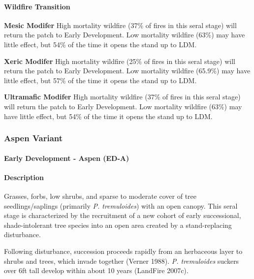 \paragraph{Wildfire Transition}

\begin{adjustwidth}{2cm}{}
\textbf{Mesic Modifer } High mortality wildfire (37\% of fires in this seral stage) will return the patch to Early Development. Low mortality wildfire (63\%) may have little effect, but 54\% of the time it opens the stand up to LDM. 

\textbf{Xeric Modifer} High mortality wildfire (25\% of fires in this seral stage) will return the patch to Early Development. Low mortality wildfire (65.9\%) may have little effect, but 57\% of the time it opens the stand up to LDM. 

\textbf{Ultramafic Modifer} High mortality wildfire (37\% of fires in this seral stage) will return the patch to Early Development. Low mortality wildfire (63\%) may have little effect, but 54\% of the time it opens the stand up to LDM.

\end{adjustwidth}

\noindent\hrulefill
\noindent\hrulefill

\subsubsection{Aspen Variant}

\paragraph{Early Development - Aspen (ED-A)}

\paragraph{Description} Grasses, forbs, low shrubs, and sparse to moderate cover of tree seedlings/saplings (primarily \emph{P. tremuloides}) with an open canopy. This seral stage is characterized by the recruitment of a new cohort of early successional, shade-intolerant tree species into an open area created by a stand-replacing disturbance.

Following disturbance, succession proceeds rapidly from an herbaceous layer to shrubs and trees, which invade together (Verner 1988). \emph{P. tremuloides} suckers over 6ft tall develop within about 10 years (LandFire 2007c). 



